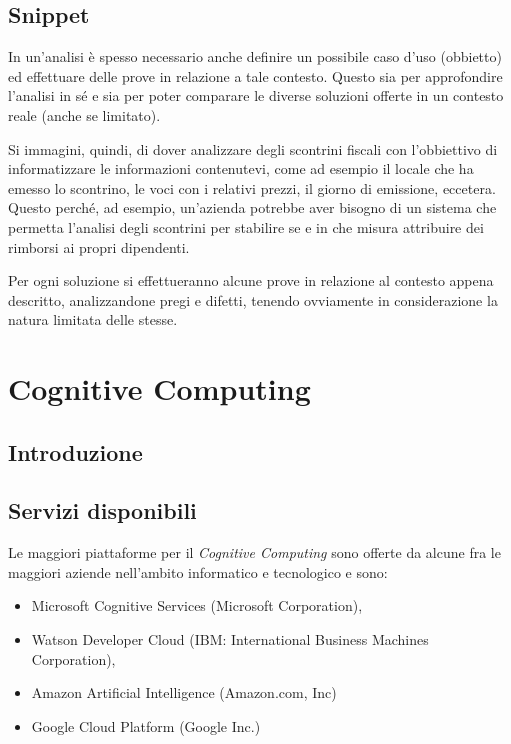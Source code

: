 \documentclass[fleqn,a4paper,11pt]{report}
\begin{document}
\section{Snippet}
In un'analisi è spesso necessario anche definire un possibile caso d'uso (obbietto) ed effettuare delle prove in relazione a tale contesto. Questo sia per approfondire l'analisi in sé e sia per poter comparare le diverse soluzioni offerte in un contesto reale (anche se limitato).

Si immagini, quindi, di dover analizzare degli scontrini fiscali con l'obbiettivo di informatizzare le informazioni contenutevi, come ad esempio il locale che ha emesso lo scontrino, le voci con i relativi prezzi, il giorno di emissione, eccetera.
Questo perché, ad esempio, un'azienda potrebbe aver bisogno di un sistema che permetta l'analisi degli scontrini per stabilire se e in che misura attribuire dei rimborsi ai propri dipendenti.

Per ogni soluzione si effettueranno alcune prove in relazione al contesto appena descritto, analizzandone pregi e difetti, tenendo ovviamente in considerazione la natura limitata delle stesse.


{\let\clearpage\relax \chapter{Cognitive Computing}}
\section{Introduzione}


\section{Servizi disponibili}
Le maggiori piattaforme per il \textit{Cognitive Computing} sono offerte da alcune fra le maggiori aziende nell'ambito informatico e tecnologico e sono:
\begin{itemize}
\item Microsoft Cognitive Services\cite{mcs-link} (Microsoft Corporation),
\item Watson Developer Cloud (IBM: International Business Machines Corporation),
\item Amazon Artificial Intelligence (Amazon.com, Inc)
\item Google Cloud Platform (Google Inc.)
\end{itemize}
\end{document}
